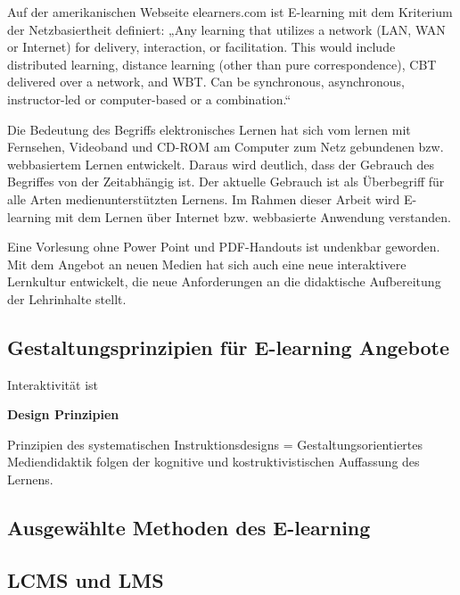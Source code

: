 \documentclass[a4paper, 12pt, twoside, BCOR=20mm, DIV=calc, abstracton, parskip=half*, toc=bibliography, toc=listof, headsepline, footsepline, headings=small, numbers=enddot]{scrreprt}
\begin{document}
	Auf der amerikanischen Webseite elearners.com  ist E-learning mit dem Kriterium der Netzbasiertheit definiert:
	„Any learning that utilizes a network (LAN, WAN or Internet) for delivery, interaction,
	or facilitation. This would include distributed learning, distance learning (other
	than pure correspondence), CBT delivered over a network, and WBT. Can be synchronous,
	asynchronous, instructor-led or computer-based or a combination.“\cite{aldrich2003simulations}
	
	Die Bedeutung des Begriffs elektronisches Lernen hat sich vom lernen mit Fernsehen, Videoband und CD-ROM am Computer zum Netz gebundenen bzw. webbasiertem Lernen entwickelt. 
	Daraus wird deutlich, dass der Gebrauch des Begriffes von der Zeitabhängig ist. Der aktuelle Gebrauch ist als Überbegriff für alle Arten medienunterstützten Lernens.\cite[S.22 ff.]{baumgartner2002learning} Im Rahmen dieser Arbeit wird E-learning mit dem Lernen über Internet bzw. webbasierte Anwendung verstanden. 
	
	
	Eine Vorlesung ohne Power Point und PDF-Handouts ist undenkbar geworden. Mit dem Angebot an neuen Medien hat sich auch eine neue interaktivere Lernkultur entwickelt, die neue Anforderungen an die didaktische Aufbereitung der Lehrinhalte stellt. 
	
	\subsection{Gestaltungsprinzipien für E-learning Angebote}
	
	Interaktivität ist 
	
	\textbf{Design Prinzipien}
	
	Prinzipien des systematischen Instruktionsdesigns = Gestaltungsorientiertes Mediendidaktik
	folgen der kognitive und kostruktivistischen Auffassung des Lernens. 
	
	\subsection{Ausgewählte Methoden des E-learning}
	
	
	
	\subsection{\ac{LCMS} und \ac{LMS}}
	
\end{document}
